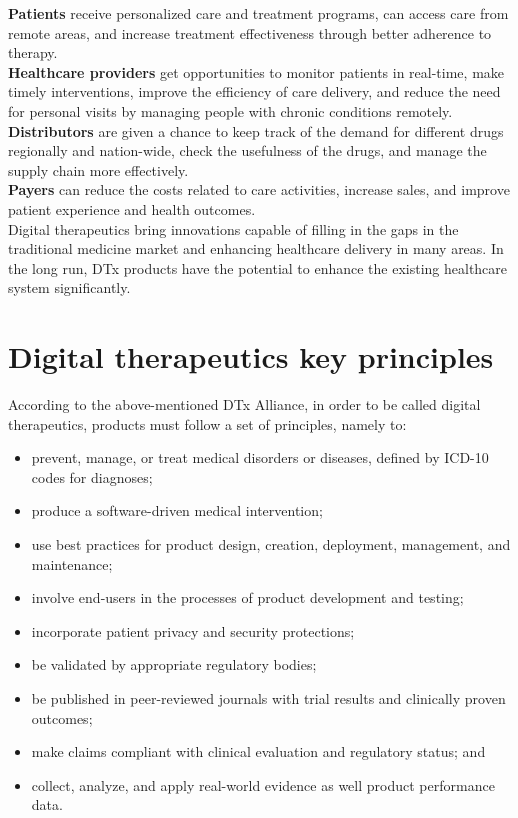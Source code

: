 \documentclass[15pt]{article}
\begin{document}
\textbf{Patients} receive personalized care and treatment programs, can access care from remote areas, and increase treatment effectiveness through better adherence to therapy.\\

\textbf{Healthcare providers} get opportunities to monitor patients in real-time, make timely interventions, improve the efficiency of care delivery, and reduce the need for personal visits by managing people with chronic conditions remotely.\\

\textbf{Distributors} are given a chance to keep track of the demand for different drugs regionally and nation-wide, check the usefulness of the drugs, and manage the supply chain more effectively.\\

\textbf{Payers} can reduce the costs related to care activities, increase sales, and improve patient experience and health outcomes.\\

Digital therapeutics bring innovations capable of filling in the gaps in the traditional medicine market and enhancing healthcare delivery in many areas. In the long run, DTx products have the potential to enhance the existing healthcare system significantly.\\


\section{Digital therapeutics key principles}
According to the above-mentioned DTx Alliance, in order to be called digital therapeutics, products must follow a set of principles, namely to:

\begin{itemize}
\item prevent, manage, or treat medical disorders or diseases, defined by ICD-10 codes for diagnoses;
\item produce a software-driven medical intervention;
\item use best practices for product design, creation, deployment, management, and maintenance;
\item involve end-users in the processes of product development and testing;
\item incorporate patient privacy and security protections;
\item be validated by appropriate regulatory bodies;
\item be published in peer-reviewed journals with trial results and clinically proven outcomes;
\item make claims compliant with clinical evaluation and regulatory status; and
\item collect, analyze, and apply real-world evidence as well product performance data.
\end{itemize}
\end{document}
